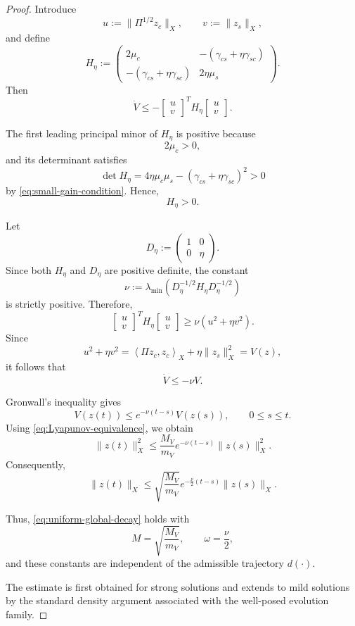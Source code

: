 \documentclass[pdflatex,sn-mathphys-num]{sn-jnl}
\theoremstyle{thmstyleone}%
\theoremstyle{thmstyletwo}%
\theoremstyle{thmstylethree}%
\begin{document}
\begin{proof}
Introduce
\[
u:=\|\Pi^{1/2}z_c\|_X,
\qquad
v:=\|z_s\|_X,
\]
and define
\[
H_\eta
:=
\begin{pmatrix}
2\mu_c
&
-\left(
\gamma_{cs}+\eta\gamma_{sc}
\right)
\\[1mm]
-\left(
\gamma_{cs}+\eta\gamma_{sc}
\right)
&
2\eta\mu_s
\end{pmatrix}.
\]
Then
\[
\dot V
\le
-
\begin{bmatrix}
u\\
v
\end{bmatrix}^{\!T}
H_\eta
\begin{bmatrix}
u\\
v
\end{bmatrix}.
\]

The first leading principal minor of \(H_\eta\) is positive because
\[
2\mu_c>0,
\]
and its determinant satisfies
\[
\det H_\eta
=
4\eta\mu_c\mu_s
-
\left(
\gamma_{cs}
+
\eta\gamma_{sc}
\right)^2
>
0
\]
by \eqref{eq:small-gain-condition}.
Hence,
\[
H_\eta>0.
\]

Let
\[
D_\eta
:=
\begin{pmatrix}
1&0\\
0&\eta
\end{pmatrix}.
\]
Since both \(H_\eta\) and \(D_\eta\) are positive definite, the constant
\[
\nu
:=
\lambda_{\min}
\left(
D_\eta^{-1/2}
H_\eta
D_\eta^{-1/2}
\right)
\]
is strictly positive. Therefore,
\[
\begin{bmatrix}
u\\
v
\end{bmatrix}^{\!T}
H_\eta
\begin{bmatrix}
u\\
v
\end{bmatrix}
\ge
\nu
\left(
u^2+\eta v^2
\right).
\]
Since
\[
u^2+\eta v^2
=
\left\langle
\Pi z_c,
z_c
\right\rangle_X
+
\eta\|z_s\|_X^2
=
V(z),
\]
it follows that
\begin{equation}
\dot V
\le
-\nu V.
\label{eq:global-Lyapunov-decay}
\end{equation}

Gronwall's inequality gives
\[
V(z(t))
\le
e^{-\nu(t-s)}
V(z(s)),
\qquad
0\le s\le t.
\]
Using
\eqref{eq:Lyapunov-equivalence}, we obtain
\[
\|z(t)\|_X^2
\le
\frac{M_V}{m_V}
e^{-\nu(t-s)}
\|z(s)\|_X^2.
\]
Consequently,
\[
\|z(t)\|_X
\le
\sqrt{\frac{M_V}{m_V}}
e^{-\frac{\nu}{2}(t-s)}
\|z(s)\|_X.
\]

Thus, \eqref{eq:uniform-global-decay}
holds with
\[
M
=
\sqrt{\frac{M_V}{m_V}},
\qquad
\omega
=
\frac{\nu}{2},
\]
and these constants are independent of the admissible trajectory \(d(\cdot)\).

The estimate is first obtained for strong solutions and extends to mild solutions by the standard density argument associated with the well-posed evolution family.

\end{proof}
\end{document}
